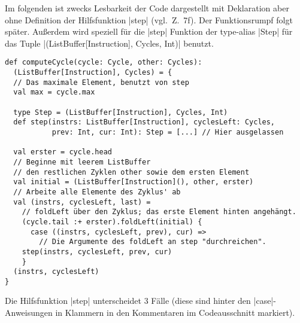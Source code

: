 Im folgenden ist zwecks Lesbarkeit der Code dargestellt mit Deklaration aber ohne Definition der Hilfsfunktion |step| (vgl.\ Z.\ 7f).
Der Funktionsrumpf folgt später.
Außerdem wird speziell für die |step| Funktion der type-alias |Step| für das Tuple |(ListBuffer[Instruction], Cycles, Int)| benutzt.
\clearpage
\lstset{basicstyle=\ttfamily}
\begin{lstlisting}
def computeCycle(cycle: Cycle, other: Cycles):
  (ListBuffer[Instruction], Cycles) = {
  // Das maximale Element, benutzt von step
  val max = cycle.max

  type Step = (ListBuffer[Instruction], Cycles, Int)
  def step(instrs: ListBuffer[Instruction], cyclesLeft: Cycles,
           prev: Int, cur: Int): Step = [...] // Hier ausgelassen

  val erster = cycle.head
  // Beginne mit leerem ListBuffer
  // den restlichen Zyklen other sowie dem ersten Element
  val initial = (ListBuffer[Instruction](), other, erster)
  // Arbeite alle Elemente des Zyklus' ab
  val (instrs, cyclesLeft, last) =
    // foldLeft über den Zyklus; das erste Element hinten angehängt.
    (cycle.tail :+ erster).foldLeft(initial) {
      case ((instrs, cyclesLeft, prev), cur) =>
        // Die Argumente des foldLeft an step "durchreichen".
	step(instrs, cyclesLeft, prev, cur)
    }
  (instrs, cyclesLeft)
}
\end{lstlisting}
\lstset{basicstyle=\ttfamily}
\clearpage
\label{faelle}
Die Hilfsfunktion |step| unterscheidet 3 Fälle (diese sind hinter den |case|-Anweisungen in Klammern in den Kommentaren im Codeausschnitt markiert).
